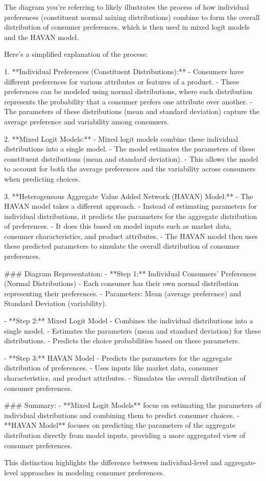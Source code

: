 The diagram you're referring to likely illustrates the process of how individual preferences (constituent normal mixing distributions) combine to form the overall distribution of consumer preferences, which is then used in mixed logit models and the HAVAN model.

Here's a simplified explanation of the process:

1. **Individual Preferences (Constituent Distributions):**
   - Consumers have different preferences for various attributes or features of a product.
   - These preferences can be modeled using normal distributions, where each distribution represents the probability that a consumer prefers one attribute over another.
   - The parameters of these distributions (mean and standard deviation) capture the average preference and variability among consumers.

2. **Mixed Logit Models:**
   - Mixed logit models combine these individual distributions into a single model.
   - The model estimates the parameters of these constituent distributions (mean and standard deviation).
   - This allows the model to account for both the average preferences and the variability across consumers when predicting choices.

3. **Heterogeneous Aggregate Value Added Network (HAVAN) Model:**
   - The HAVAN model takes a different approach.
   - Instead of estimating parameters for individual distributions, it predicts the parameters for the aggregate distribution of preferences.
   - It does this based on model inputs such as market data, consumer characteristics, and product attributes.
   - The HAVAN model then uses these predicted parameters to simulate the overall distribution of consumer preferences.

### Diagram Representation:
- **Step 1:** Individual Consumers' Preferences (Normal Distributions)
  - Each consumer has their own normal distribution representing their preferences.
  - Parameters: Mean (average preference) and Standard Deviation (variability).

- **Step 2:** Mixed Logit Model
  - Combines the individual distributions into a single model.
  - Estimates the parameters (mean and standard deviation) for these distributions.
  - Predicts the choice probabilities based on these parameters.

- **Step 3:** HAVAN Model
  - Predicts the parameters for the aggregate distribution of preferences.
  - Uses inputs like market data, consumer characteristics, and product attributes.
  - Simulates the overall distribution of consumer preferences.

### Summary:
- **Mixed Logit Models** focus on estimating the parameters of individual distributions and combining them to predict consumer choices.
- **HAVAN Model** focuses on predicting the parameters of the aggregate distribution directly from model inputs, providing a more aggregated view of consumer preferences.

This distinction highlights the difference between individual-level and aggregate-level approaches in modeling consumer preferences.